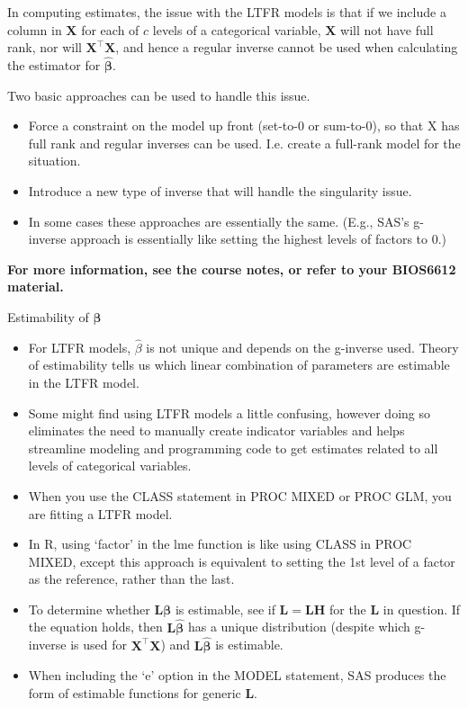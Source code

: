 \documentclass[
  9pt,
  ignorenonframetext,
]{beamer}
\begin{document}
\begin{frame}{}
\protect\hypertarget{section-1}{}
In computing estimates, the issue with the LTFR models is that if we
include a column in \(\pmb X\) for each of \(c\) levels of a categorical
variable, \(\pmb X\) will not have full rank, nor will
\(\pmb {X^{\top}X}\), and hence a regular inverse cannot be used when
calculating the estimator for \(\pmb {\hat \beta}\).

Two basic approaches can be used to handle this issue.

\begin{itemize}
\item
  Force a constraint on the model up front (set-to-0 or sum-to-0), so
  that X has full rank and regular inverses can be used. I.e. create a
  full-rank model for the situation.
\item
  Introduce a new type of inverse that will handle the singularity
  issue.
\item
  In some cases these approaches are essentially the same. (E.g., SAS's
  g-inverse approach is essentially like setting the highest levels of
  factors to 0.)
\end{itemize}

\textbf{For more information, see the course notes, or refer to your
BIOS6612 material.}
\end{frame}

\begin{frame}{Estimability of \(\pmb \beta\)}
\protect\hypertarget{estimability-of-pmb-beta}{}
\begin{itemize}
\item
  For LTFR models, \(\hat \beta\) is not unique and depends on the
  g-inverse used. Theory of estimability tells us which linear
  combination of parameters are estimable in the LTFR model.
\item
  Some might find using LTFR models a little confusing, however doing so
  eliminates the need to manually create indicator variables and helps
  streamline modeling and programming code to get estimates related to
  all levels of categorical variables.
\item
  When you use the CLASS statement in PROC MIXED or PROC GLM, you are
  fitting a LTFR model.
\item
  In R, using `factor' in the lme function is like using CLASS in PROC
  MIXED, except this approach is equivalent to setting the 1st level of
  a factor as the reference, rather than the last.
\item
  To determine whether \(\pmb {L\beta}\) is estimable, see if
  \(\pmb {L=LH}\) for the \(\pmb L\) in question. If the equation holds,
  then \(\pmb {L\hat \beta}\) has a unique distribution (despite which
  g-inverse is used for \(\pmb {X^{\top}X}\)) and \(\pmb {L\hat \beta}\)
  is estimable.
\item
  When including the `e' option in the MODEL statement, SAS produces the
  form of estimable functions for generic \(\pmb L\).
\end{itemize}
\end{frame}
\end{document}
